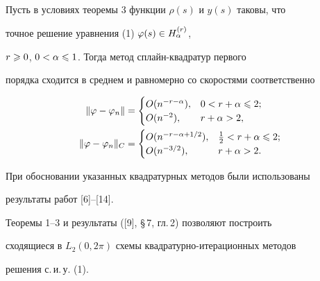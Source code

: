 \begin{cornonum}


Пусть в условиях теоремы 3 функции $\rho(s)$ и $y(s)$ таковы, что 


точное решение уравнения (1) $\varphi(s)\in H^{(r)}_\alpha$,


$r\geqslant 0$, $0<\alpha\leqslant 1$. Тогда метод сплайн-квадратур первого 


порядка сходится в среднем и равномерно со скоростями соответственно


\begin{align*}


\|\vp - \vp_n\| &= 


\begin{cases}


O(n^{-r-\alpha}),&0<r+\alpha\lea 2; \\


O(n^{-2}),&r+\alpha>2,


\end{cases}


\\


\|\vp - \vp_n\|_C &=


\begin{cases}


O(n^{-r-\alpha+1/2}),&\frac{1}{2}<r+\alpha\lea 2; \\


O(n^{-3/2}),&r+\alpha>2.


\end{cases}


\end{align*}


\end{cornonum}





При обосновании указанных квадратурных методов были использованы 


результаты работ [6]--[14].





\begin{note}


Теоремы 1--3 и результаты ([9], \S\,7, гл.\,2) позволяют построить 


сходящиеся в $L_2(0,2\pi)$ схемы квадратурно-итерационных методов 


решения с.\,и.\,у. (1).


\end{note}





